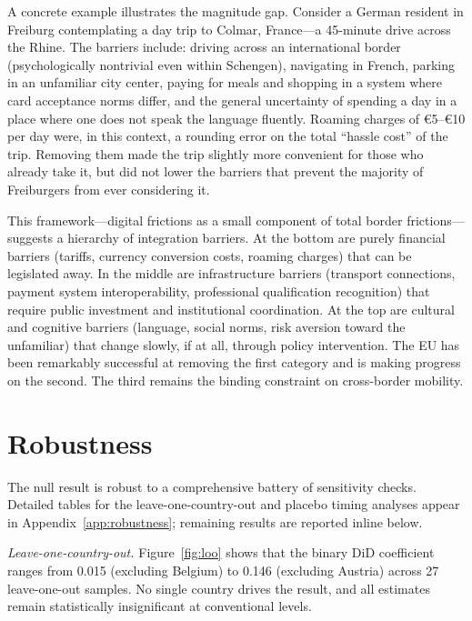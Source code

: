 \documentclass[12pt]{article}
\newcommand{\EUR}[1]{\euro#1}
\begin{document}
A concrete example illustrates the magnitude gap. Consider a German resident in Freiburg contemplating a day trip to Colmar, France---a 45-minute drive across the Rhine. The barriers include: driving across an international border (psychologically nontrivial even within Schengen), navigating in French, parking in an unfamiliar city center, paying for meals and shopping in a system where card acceptance norms differ, and the general uncertainty of spending a day in a place where one does not speak the language fluently. Roaming charges of \EUR{5}--\EUR{10} per day were, in this context, a rounding error on the total ``hassle cost'' of the trip. Removing them made the trip slightly more convenient for those who already take it, but did not lower the barriers that prevent the majority of Freiburgers from ever considering it.

This framework---digital frictions as a small component of total border frictions---suggests a hierarchy of integration barriers. At the bottom are purely financial barriers (tariffs, currency conversion costs, roaming charges) that can be legislated away. In the middle are infrastructure barriers (transport connections, payment system interoperability, professional qualification recognition) that require public investment and institutional coordination. At the top are cultural and cognitive barriers (language, social norms, risk aversion toward the unfamiliar) that change slowly, if at all, through policy intervention. The EU has been remarkably successful at removing the first category and is making progress on the second. The third remains the binding constraint on cross-border mobility.


\section{Robustness}

The null result is robust to a comprehensive battery of sensitivity checks. Detailed tables for the leave-one-country-out and placebo timing analyses appear in Appendix~\ref{app:robustness}; remaining results are reported inline below.

\textit{Leave-one-country-out.} Figure~\ref{fig:loo} shows that the binary DiD coefficient ranges from 0.015 (excluding Belgium) to 0.146 (excluding Austria) across 27 leave-one-out samples. No single country drives the result, and all estimates remain statistically insignificant at conventional levels.
\end{document}
